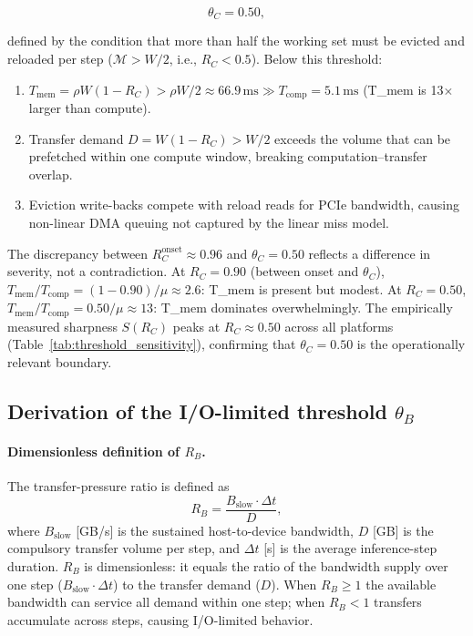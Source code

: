 \begin{equation}
\theta_C = 0.50,
\label{eq:thetaC}
\end{equation}

defined by the condition that more than half the working set must be evicted
and reloaded per step ($\mathcal{M} > W/2$, i.e., $R_C < 0.5$).
Below this threshold:
\begin{enumerate}
  \item $T_{\mathrm{mem}} = \rho W(1-R_C) > \rho W/2
        \approx 66.9\,\mathrm{ms} \gg T_{\mathrm{comp}} = 5.1\,\mathrm{ms}$
        (T\_mem is 13$\times$ larger than compute).
  \item Transfer demand $D = W(1-R_C) > W/2$ exceeds the volume that can be
        prefetched within one compute window, breaking computation--transfer
        overlap.
  \item Eviction write-backs compete with reload reads for PCIe bandwidth,
        causing non-linear DMA queuing not captured by the linear miss model.
\end{enumerate}
The discrepancy between $R_C^{\mathrm{onset}} \approx 0.96$ and
$\theta_C = 0.50$ reflects a difference in severity, not a contradiction.
At $R_C = 0.90$ (between onset and $\theta_C$), $T_{\mathrm{mem}} / T_{\mathrm{comp}} = (1-0.90)/\mu \approx 2.6$:
T\_mem is present but modest.
At $R_C = 0.50$, $T_{\mathrm{mem}} / T_{\mathrm{comp}} = 0.50/\mu \approx 13$:
T\_mem dominates overwhelmingly.
The empirically measured sharpness $S(R_C)$ peaks at $R_C \approx 0.50$ across
all platforms (Table~\ref{tab:threshold_sensitivity}), confirming that
$\theta_C = 0.50$ is the operationally relevant boundary.

\subsection{Derivation of the I/O-limited threshold $\theta_B$}
\label{app:thetaB}

\paragraph{Dimensionless definition of $R_B$.}
The transfer-pressure ratio is defined as
\begin{equation}
R_B = \frac{B_{\mathrm{slow}} \cdot \Delta t}{D},
\label{eq:RB_def}
\end{equation}
where $B_{\mathrm{slow}}$ [GB/s] is the sustained host-to-device bandwidth,
$D$ [GB] is the compulsory transfer volume per step, and $\Delta t$ [s] is the
average inference-step duration.
$R_B$ is dimensionless: it equals the ratio of the bandwidth supply over one
step ($B_{\mathrm{slow}} \cdot \Delta t$) to the transfer demand ($D$).
When $R_B \geq 1$ the available bandwidth can service all demand within one
step; when $R_B < 1$ transfers accumulate across steps, causing I/O-limited
behavior.

